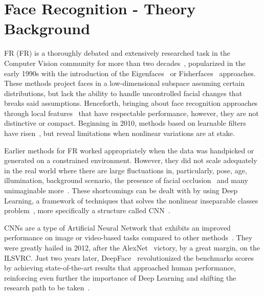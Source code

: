 \documentclass[class=report, crop=false, a4paper, 12pt]{standalone}
\begin{document}

\section{Face Recognition - Theory Background}
\par \acrlong{FR} (FR) is a thoroughly debated and extensively researched task in the Computer Vision community for more than two decades~\autocite{ranjanDeepLearningUnderstanding2018}, popularized in the early 1990s with the introduction of the Eigenfaces~\autocite{turkEigenfacesRecognition1991} or Fisherfaces~\autocite{p.n.belhumeurEigenfacesVsFisherfaces1997} approaches. These methods project faces in a low-dimensional subspace assuming certain distributions, but lack the ability to handle uncontrolled facial changes that breaks said assumptions. Henceforth, bringing about face recognition approaches through local features~\autocite{chengjunliuGaborFeatureBased2002, ahonenFaceDescriptionLocal2006} that have respectable performance, however, they are not distinctive or compact. Beginning in 2010, methods based on learnable filters have risen~\autocite{z.caoFaceRecognitionLearningbased2010,leiLearningDiscriminantFace2014}, but reveal limitations when nonlinear variations are at stake.

\par Earlier methods for FR worked appropriately when the data was handpicked or generated on a constrained environment. However, they did not scale adequately in the real world where there are large fluctuations in, particularly, pose, age, illumination, background scenario, the presence of facial occlusion~\autocite{ranjanDeepLearningUnderstanding2018} and many unimaginable more~\autocite{kalkaIJBIARPAJanus2018}. These shortcomings can be dealt with by using Deep Learning, a framework of techniques that solves the nonlinear inseparable classes problem~\autocite{minsky69perceptrons}, more specifically a structure called \gls{CNN}~\autocite{wangDeepFaceRecognition2021}. 

\par CNNs are a type of Artificial Neural Network that exhibits an improved performance on image or video-based tasks compared to other methods~\autocite{lecunGradientBasedLearningApplied1998}. They were greatly hailed in 2012, after the AlexNet~\autocite{krizhevskyImageNetClassificationDeep2012} victory, by a great margin, on the \gls{ILSVRC}. Just two years later, DeepFace~\autocite{taigmanDeepFaceClosingGap2014} revolutionized the benchmarks scores by achieving state-of-the-art results that approached human performance, reinforcing even further the importance of Deep Learning and shifting the research path to be taken~\autocite{wangDeepFaceRecognition2021}.
\end{document}
